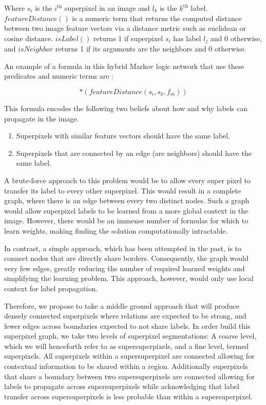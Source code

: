 \documentclass{article} %
\begin{document}
\noindent Where $s_i$ is the $i^\textrm{th}$ superpixel in an image and $l_k$ is the $k^\textrm{th}$ label. $featureDistance()$ is a numeric term that returns the computed distance between two image feature vectors via a distance metric such as euclidean or cosine distance. $isLabel()$ returns 1 if superpixel $s_i$ has label $l_j$ and 0 otherwise, and $isNeighbor$ returns 1 if its arguments are the neighbors and 0 otherwise. 

An example of a formula in this hybrid Markov logic network that use these predicates and numeric terms are :

\begin{equation*}
	[isNeighbor(s_i,s_j) \Rightarrow (isLabel(s_i,l_k) \Leftrightarrow isLabel(s_k,l_m))]*(featureDistance(s_i, s_k, f_m))
\end{equation*}

\noindent This formula encodes the following two beliefs about how and why labels can propagate in the image.

\begin{enumerate}
\item
	Superpixels with similar feature vectors should have the same label.
\item
	Superpixels that are connected by an edge (are neighbors) should have the same label.
\end{enumerate}

A brute-force approach to this problem would be to allow every super pixel to transfer its label to every other superpixel. This would result in a complete graph, where there is an edge between every two distinct nodes. Such a graph would allow superpixel labels to be learned from a more global context in the image. However, there would be an immense number of formulas for which to learn weights, making finding the solution computationally intractable. 

In contrast, a simple approach, which has been attempted in the past, \cite{} %
is to connect nodes that are directly share borders. Consequently, the graph would very few edges, greatly reducing the number of required learned weights and simplifying the learning problem. This approach, however, would only use local context for label propagation.

Therefore, we propose to take a middle ground approach that will produce densely connected superpixels where relations are expected to be strong, and fewer edges across boundaries expected to not share labels. In order build this superpixel graph, we take two levels of superpixel segmentations: A coarse level, which we will henceforth refer to as supersuperpixels, and a fine level, termed superpixels. All superpixels within a supersuperpixel are connected allowing for contextual information to be shared within a region. Additionally superpixels that share a boundary between two supersuperpixels are connected allowing for labels to propagate across supersuperpixels while acknowledging that label transfer across supersuperpixels is less probable than within a supersuperpixel.
\end{document}
